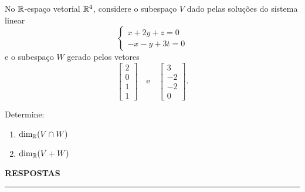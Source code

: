 \documentclass[12pt]{exam}
\begin{document}
    \begin{exercicio}
        No $\mathbb{R}$-espa\c{c}o vetorial $\mathbb{R}^4$, considere o subespa\c{c}o $V$ dado pelas solu\c{c}\~oes do sistema linear
        \[
            \begin{cases}
                x + 2y + z = 0\\
                -x -y + 3t = 0
            \end{cases}
        \]
        e o subespa\c{c}o $W$ gerado pelos vetores
        \[
            \begin{bmatrix}
                2\\
                0\\
                1\\
                1
            \end{bmatrix} \quad \mbox{e}\quad
            \begin{bmatrix}
                3\\
                -2\\
                -2\\
                0
            \end{bmatrix}.
        \]
        
        Determine:
        \begin{enumerate}[label={\alph*})]
            \item $\dim_{\mathbb{R}}(V \cap W)$
            
            \item $\dim_{\mathbb{R}}(V + W)$
        \end{enumerate}
    \end{exercicio}

    \newpage
    

    \begin{center}
        {\large\bf RESPOSTAS}
    \end{center}

    \hrule
    
    
\end{document}
